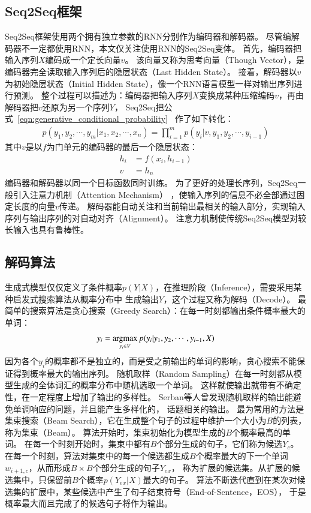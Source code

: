 \subsection{Seq2Seq框架}\label{subsec:Seq2Seq}
Seq2Seq框架使用两个拥有独立参数的RNN分别作为编码器和解码器。
尽管编解码器不一定都使用RNN，本文仅关注使用RNN的Seq2Seq变体。
首先，编码器把输入序列$X$编码成一个定长向量$v$。
该向量又称为思考向量（Though Vector），是编码器完全读取输入序列后的隐层状态（Last Hidden State）。
接着，解码器以$v$为初始隐层状态（Initial Hidden State），像一个RNN语言模型一样对输出序列进行预测。
整个过程可以描述为：编码器把输入序列$X$变换成某种压缩编码$v$，再由解码器把$v$还原为另一个序列$Y$，
Seq2Seq把公式~\ref{eqn:generative_conditional_probability}~
作了如下转化：
\begin{align}
    p(y_1, y_2, \cdots, y_m|x_1, x_2, \cdots, x_n) = \prod_{i=1}^m p(y_i|v, y_1, y_2, \cdots, y_{i-1})
\end{align}
其中$v$是以$f$为门单元的编码器的最后一个隐层状态：
\begin{align}
    h_i &= f(x_i ,h_{i-1}) \\
    v &= h_n
\end{align}
编码器和解码器以同一个目标函数同时训练。
为了更好的处理长序列，Seq2Seq一般引入注意力机制（Attention Mechanism）
，使输入序列的信息不必全部通过固定长度的向量$v$传递。
解码器能自动关注和当前输出最相关的输入部分，实现输入序列与输出序列的对自动对齐（Alignment）。
注意力机制使传统Seq2Seq模型对较长输入也具有鲁棒性。

\subsection{解码算法}\label{subsec:decode}
生成式模型仅仅定义了条件概率$p(Y|X)$，在推理阶段（Inference），需要采用某种启发式搜索算法从概率分布中
生成输出$Y$，这个过程又称为解码（Decode）。
最简单的搜索算法是贪心搜索（Greedy Search）：在每一时刻都输出条件概率最大的单词：
\begin{align}
    y_i = \operatorname*{argmax}_{y_i \in V} p(y_i|y_1, y_2, \cdots, y_{i-1}, X)
\end{align}
因为各个$y_i$的概率都不是独立的，而是受之前输出的单词的影响，贪心搜索不能保证得到概率最大的输出序列。
随机取样（Random Sampling）在每一时刻都从模型生成的全体词汇的概率分布中随机选取一个单词。
这样就使输出就带有不确定性，在一定程度上增加了输出的多样性。
Serban等人曾发现随机取样的输出能避免单调响应的问题，并且能产生多样化的，
话题相关的输出。
最为常用的方法是集束搜索（Beam Search），它在生成整个句子的过程中维护一个大小为$B$的列表，称为集束（Beam）。
算法开始时，集束初始化为模型生成的$B$个概率最高的单词。
在每一个时刻开始时，集束中都有$B$个部分生成的句子，它们称为候选$Y_c$。
在每一个时刻，算法对集束中的每一个候选都生成$B$个概率最大的下一个单词$w_{i+1, c}$，从而形成$B \times B$个部分生成的句子$Y_{ex}$，
称为扩展的候选集。从扩展的候选集中，只保留前$B$个概率$p(Y_{ex}|X)$最大的句子。
算法不断迭代直到在某次对候选集的扩展中，某些候选中产生了句子结束符号（End-of-Sentence，EOS），
于是概率最大而且完成了的候选句子将作为输出。

